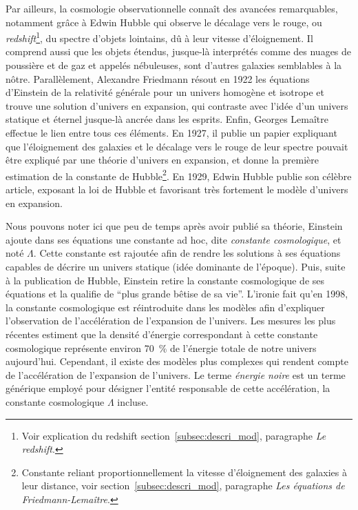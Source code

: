 Par ailleurs, la cosmologie observationnelle connaît des avancées remarquables, notamment grâce à Edwin Hubble qui observe le décalage vers le rouge, ou \emph{redshift}\footnote{Voir explication du redshift section~\ref{subsec:descri_mod}, paragraphe \emph{Le redshift}.}, du spectre d'objets lointains, dû à leur vitesse d'éloignement. Il comprend aussi que les objets étendus, jusque-là interprétés comme des nuages de poussière et de gaz et appelés nébuleuses, sont d'autres galaxies semblables à la nôtre. Parallèlement, Alexandre Friedmann résout en 1922 les équations d'Einstein de la relativité générale pour un univers homogène et isotrope et trouve une solution d'univers en expansion, qui contraste avec l'idée d'un univers statique et éternel jusque-là ancrée dans les esprits. Enfin, Georges Lemaître effectue le lien entre tous ces éléments. En 1927, il publie un papier expliquant que l'éloignement des galaxies et le décalage vers le rouge de leur spectre pouvait être expliqué par une théorie d'univers en expansion, et donne la première estimation de la constante de Hubble\footnote{Constante reliant proportionnellement la vitesse d'éloignement des galaxies à leur distance, voir section~\ref{subsec:descri_mod}, paragraphe \emph{Les équations de Friedmann-Lemaître}.}. En 1929, Edwin Hubble publie son célèbre article, exposant la loi de Hubble et favorisant très fortement le modèle d'univers en expansion.

Nous pouvons noter ici que peu de temps après avoir publié sa théorie, Einstein ajoute dans ses équations une constante ad hoc, dite \emph{constante cosmologique}, et noté $\Lambda$. Cette constante est rajoutée afin de rendre les solutions à ses équations capables de décrire un univers statique (idée dominante de l'époque). Puis, suite à la publication de Hubble, Einstein retire la constante cosmologique de ses équations et la qualifie de ``plus grande bêtise de sa vie''. L'ironie fait qu'en 1998, la constante cosmologique est réintroduite dans les modèles afin d'expliquer l'observation de l'accélération de l'expansion de l'univers. Les mesures les plus récentes estiment que la densité d'énergie correspondant à cette constante cosmologique représente environ \SI{70}{\percent} de l'énergie totale de notre univers aujourd'hui. Cependant, il existe des modèles plus complexes qui rendent compte de l'accélération de l'expansion de l'univers. Le terme \emph{énergie noire} est un terme générique employé pour désigner l'entité responsable de cette accélération, la constante cosmologique $\Lambda$ incluse.

